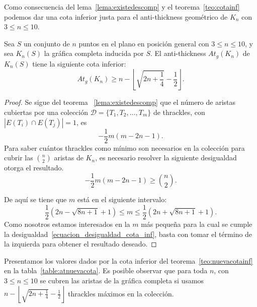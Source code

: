   Como consecuencia del lema~\ref{lema:existedescomp} y el teorema~\ref{teo:cotainf} podemos dar una cota inferior justa para el anti-thickness geométrico de $K_n$ con $3 \leq n \leq 10$.

  \begin{theorem}\label{teo:nuevacotainf}
    Sea $S$ un conjunto de $n$ puntos en el plano en posición general con $3\leq n \leq 10$, y sea $K_n(S)$ la gráfica completa inducida por $S$. El anti-thickness $At_g(K_n)$ de $K_n(S)$ tiene la siguiente cota inferior:
    \begin{equation}
      At_g(K_n) \geq n - \left\lfloor\sqrt{2n+\frac{1}{4}} - \frac{1}{2}\right\rfloor.
      \label{ecuacion_cota_inf}
    \end{equation}
  \end{theorem}
  \begin{proof}
    Se sigue del teorema ~\ref{lema:existedescomp} que el número de aristas
    cubiertas por una colección $\mathcal{D}=\{T_1,T_2,\dots,T_m\}$ de thrackles,
    con $|E(T_i)\cap E(T_j)| = 1$, es
    \[ -\frac{1}{2}m(m-2n-1). \]
    Para saber cuántos thrackles como mínimo son necesarios en la colección para
    cubrir las $\binom{n}{2}$ aristas de $K_n$, es necesario resolver la
    siguiente desigualdad otorga el resultado.
    \begin{equation}
       -\frac{1}{2}m(m-2n-1) \geq \binom{n}{2}.
       \label{ecuacion_desigualdad_cota_inf}
    \end{equation}

    De aquí se tiene que $m$ está en el siguiente intervalo:
    \[
      \frac{1}{2}\left(2n-\sqrt{8n+1} + 1\right) \leq m \leq  \frac{1}{2}\left(2n+\sqrt{8n+1} + 1\right).
    \]
    Como nosotros estamos interesados en la $m$ más pequeña para la cual se cumple la desigualdad~\ref{ecuacion_desigualdad_cota_inf}, basta con tomar el término de la izquierda para obtener el resultado deseado.
  \end{proof}
    Presentamos los valores dados por la cota inferior del
    teorema~\ref{teo:nuevacotainf} en la tabla~\ref{table:atnuevacota}.
    Es posible observar que para toda $n$, con $3\leq n\leq 10$ se cubren las aristas de la gráfica completa si usamos $n - \left\lfloor\sqrt{2n+\frac{1}{4}} - \frac{1}{2}\right\rfloor$ thrackles máximos
    en la colección.
